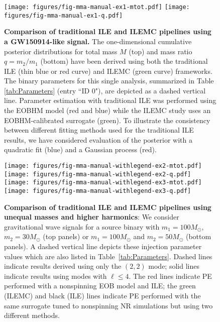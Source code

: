 \documentclass[aps,prd,nofootinbib,showpacs,amssymb,twocolumn]{revtex4}
\begin{document}
%
%
%


\begin{figure}
%
%
\vskip20pt
\texttt{[image: figures/fig-mma-manual-ex1-mtot.pdf]}
\texttt{[image: figures/fig-mma-manual-ex1-q.pdf]}
\caption{\label{fig:Results}
\textbf{Comparison of traditional ILE and ILEMC  pipelines using a GW150914-like signal.} The one-dimensional
cumulative posterior distributions for 
  total mass $M$ (top) and mass ratio $q=m_2/m_1$ (bottom) have been derived
  using both the traditional ILE (thin blue or red curve)
%
and ILEMC (green curve) frameworks.
%
The binary parameters
    for this single analysis, summarized in Table \ref{tab:Parameters} (entry ``ID 0"), 
are depicted as a
%
dashed vertical line. 
%
Parameter estimation with traditional ILE was performed using the EOBHM model (red and blue) while the ILEMC study uses an EOBHM-calibrated surrogate (green).
To illustrate the consistency between different fitting methods used 
%
for the traditional ILE results, 
we have considered evaluation of the posterior with a quadratic fit (blue) and a Gaussian process (red).
%
}
\end{figure}

\begin{figure*}
\texttt{[image: figures/fig-mma-manual-withlegend-ex2-mtot.pdf]}
\texttt{[image: figures/fig-mma-manual-withlegend-ex2-q.pdf]}
\texttt{[image: figures/fig-mma-manual-withlegend-ex3-mtot.pdf]}
\texttt{[image: figures/fig-mma-manual-withlegend-ex3-q.pdf]}

\caption{\label{fig:Results:2}\textbf{Comparison of traditional ILE and ILEMC pipelines using unequal masses and higher harmonics}: We consider gravitational wave signals
%
for a source binary with $m_1=100 M_\odot$, $m_2=30M_\odot$ (top panels) or  $m_1=100M_\odot$ and $m_2=50M_\odot$ (bottom panels).
A dashed vertical line depicts these injection parameter values which are also listed in Table~\ref{tab:Parameters}.
Dashed lines indicate results derived using only the $(2,2)$ mode; solid lines indicate results using modes with $\ell \le 4$.
%
%
%
%
%
  The red lines indicate PE performed with a nonspinning EOB model and ILE; the green (ILEMC) and black (ILE) lines indicate 
  PE performed with the same surrogate tuned to nonspinning NR simulations \cite{gwastro-approx-ROMNR-Blackman2015} but using two different methods.
}
\end{figure*}
\end{document}

